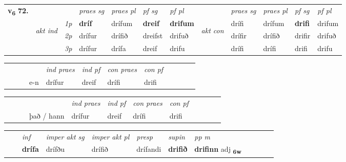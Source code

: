 \begin{tabular}{llllllllllll} \toprule
\multirow{4}{*}{{{\textbf{v{\textsubscript{6}}} \Large{\textbf{72.}}}}}  & &   &  \textit{praes sg}  & \textit{praes pl}  &\textit{ pf sg} & \textit{pf pl} &  &  \textit{praes sg}  & \textit{praes pl}  & \textit{pf sg} & \textit{pf pl } \\*
	\cmidrule{4-7} \cmidrule{9-12}
 & \multirow{3}{*}{\begin{turn}{90}\textit{akt ind}\end{turn}} & {\textit{1p}} & \textbf{dríf} & drífum    & \textbf{dreif} & \textbf{drifum} & \multirow{3}{*}{\begin{turn}{90}\textit{akt con}\end{turn}} &drífi & drífum & \textbf{drifi} & drifum\\*
& &  {\textit{2p}} &  drífur  & drífið   & dreifst & drifuð & & drífir & drífið & drifir & drifuð \\*
& &  {\textit{3p}} & drífur & drífa   & dreif & drifu & & drífi & drífi& drifi & drifu  \\*
\cmidrule{4-7} \cmidrule{9-12}
\end{tabular}


\begin{tabular}{llllllllllll}
 & &  & &  \textit{ind praes} & \textit{ind pf} & \textit{con praes} & \textit{con pf} \\*
&  & & e-n & drífur & dreif & drífi & drifi \\*
\cmidrule{5-9}
\end{tabular}


\begin{tabular}{llllllllllll}
 & &  & &  \textit{ind praes} & \textit{ind pf} & \textit{con praes} & \textit{con pf} \\*
&  & & það / hann & drífur & dreif & drífi & drifi \\*
\cmidrule{5-9}
\end{tabular}


\begin{tabular}{llllllllllll}
 & & \textit{inf} & \textit{imper akt sg} & \textit{imper akt pl}   & \textit{presp} & \textit{supin}  & \textit{pp m}     \\*
  & & \textbf{drífa} & drífðu  & drífið   & drífandi &  \textbf{drifið}  & \textbf{drifinn} adj \textbf{\textsubscript{6w}} \\*
\cmidrule{1-12}
\end{tabular}



